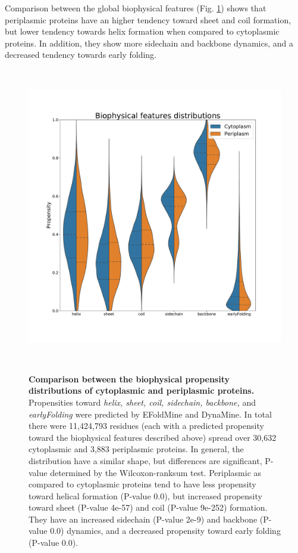 Comparison between the global biophysical features (Fig. \ref{fig:global_biophysical}) 
shows that periplasmic proteins have an higher tendency toward sheet and coil formation,
but lower tendency towards helix formation when compared to cytoplasmic proteins. 
In addition, they show more sidechain and backbone dynamics,
and a decreased tendency towards early folding.

~\begin{figure}[h!]
	\includegraphics[width=\linewidth]{./results/general_comparison/global_comparison/biophysical/img/features_violin.pdf}
	\caption{
		\textbf{Comparison between the biophysical propensity distributions of cytoplasmic and periplasmic proteins.}
		Propensities toward 
		\textit{helix,
		sheet,
		coil,
		sidechain,
		backbone,}
		and
		\textit{earlyFolding}
		were predicted by EFoldMine and DynaMine.
		In total there were 11,424,793 residues (each with a predicted propensity toward the biophysical features described above) spread over 30,632 cytoplasmic  and 3,883 periplasmic proteins.
		In general, the distribution have a similar shape,
		but differences are significant, P-value determined by the Wilcoxon-ranksum test.
		Periplasmic as compared to cytoplasmic proteins tend to have
		less propensity toward helical formation (P-value 0.0),	
		but increased propensity toward sheet (P-value 4e-57) and coil (P-value 9e-252) formation.
		They have an increased sidechain (P-value 2e-9) and backbone (P-value 0.0) dynamics,
		and a decreased propensity toward early folding (P-value 0.0).
		}
	\label{fig:global_biophysical}
~\end{figure}
